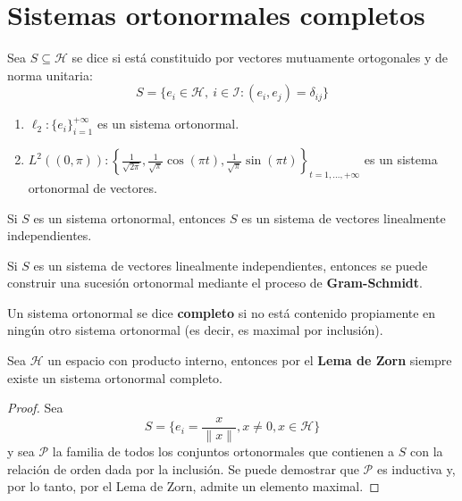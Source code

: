 \chapter{Sistemas ortonormales completos}

\begin{definicion}
    Sea $S\subseteq \mathcal{H}$ se dice  si está constituido por vectores mutuamente ortogonales y de norma unitaria:
    \[ S = \{ e_i \in \mathcal{H}, \ i \in \mathcal{I} : (e_i, e_j) = \delta_{ij}\}\]
\end{definicion}


\begin{ejemplo}
    \begin{enumerate}
        \item $\ell_2 : \{e_i\}_{i=1}^{+\infty}$ es un sistema ortonormal.
        \item $L^2((0, \pi)) : \left\{ \frac{1}{\sqrt{2\pi}}, \frac{1}{\sqrt{\pi}} \cos(\pi t), \frac{1}{\sqrt{\pi}} \sin(\pi t) \right\}_{t=1, \dots, +\infty}$ es un sistema ortonormal de vectores. \\
    \end{enumerate}
\end{ejemplo}

\begin{observacion}
    Si $S$ es un sistema ortonormal, entonces $S$ es un sistema de vectores linealmente independientes.
\end{observacion}


\begin{observacion}
    Si $S$ es un sistema de vectores linealmente independientes, entonces se puede construir una sucesión ortonormal mediante el proceso de \textbf{Gram-Schmidt}. \\
\end{observacion}


\begin{definicion}
    Un sistema ortonormal se dice \textbf{completo} si no está contenido propiamente en ningún otro sistema ortonormal (es decir, es maximal por inclusión). \\
\end{definicion}

\begin{prop}
    Sea $\mathcal{H}$ un espacio con producto interno, entonces por el \textbf{Lema de Zorn} siempre existe un sistema ortonormal completo. 
\begin{proof}
    Sea 
    $$S = \{ e_i = \frac{x}{\|x\|}, x \neq 0 , x\in \mathcal{H}\}$$ 
    y sea $\mathcal{P}$ la familia de todos los conjuntos ortonormales que contienen a $S$ con la relación de orden dada por la inclusión. Se puede demostrar que $\mathcal{P}$ es inductiva y, por lo tanto, por el Lema de Zorn, admite un elemento maximal.
\end{proof}
\end{prop}


